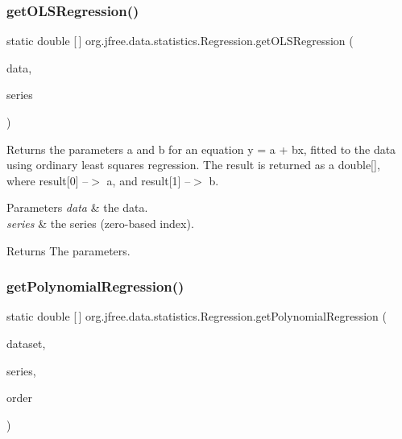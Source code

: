\subsubsection{\texorpdfstring{get\+O\+L\+S\+Regression()}{getOLSRegression()}\hspace{0.1cm}{\footnotesize\ttfamily [2/2]}}
{\footnotesize\ttfamily static double \mbox{[}$\,$\mbox{]} org.\+jfree.\+data.\+statistics.\+Regression.\+get\+O\+L\+S\+Regression (\begin{DoxyParamCaption}\item[{\mbox{\hyperlink{interfaceorg_1_1jfree_1_1data_1_1xy_1_1_x_y_dataset}{X\+Y\+Dataset}}}]{data,  }\item[{int}]{series }\end{DoxyParamCaption})\hspace{0.3cm}{\ttfamily [static]}}

Returns the parameters \textquotesingle{}a\textquotesingle{} and \textquotesingle{}b\textquotesingle{} for an equation y = a + bx, fitted to the data using ordinary least squares regression. The result is returned as a double\mbox{[}\mbox{]}, where result\mbox{[}0\mbox{]} --$>$ a, and result\mbox{[}1\mbox{]} --$>$ b.


\begin{DoxyParams}{Parameters}
{\em data} & the data. \\
\hline
{\em series} & the series (zero-\/based index).\\
\hline
\end{DoxyParams}
\begin{DoxyReturn}{Returns}
The parameters. 
\end{DoxyReturn}
\mbox{\label{classorg_1_1jfree_1_1data_1_1statistics_1_1_regression_a8dace72fbe5029ee28a88ab43640f655}} 
\subsubsection{\texorpdfstring{get\+Polynomial\+Regression()}{getPolynomialRegression()}}
{\footnotesize\ttfamily static double \mbox{[}$\,$\mbox{]} org.\+jfree.\+data.\+statistics.\+Regression.\+get\+Polynomial\+Regression (\begin{DoxyParamCaption}\item[{\mbox{\hyperlink{interfaceorg_1_1jfree_1_1data_1_1xy_1_1_x_y_dataset}{X\+Y\+Dataset}}}]{dataset,  }\item[{int}]{series,  }\item[{int}]{order }\end{DoxyParamCaption})\hspace{0.3cm}{\ttfamily [static]}}

